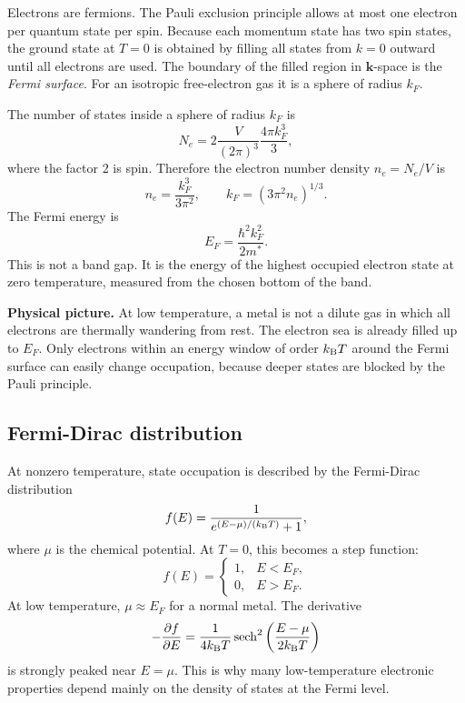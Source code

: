 \documentclass[11pt]{article}
\newcommand{\bk}{{\bm{k}}}
\begin{document}
Electrons are fermions. The Pauli exclusion principle allows at most one electron per quantum state per spin. Because each momentum state has two spin states, the ground state at $T=0$ is obtained by filling all states from $k=0$ outward until all electrons are used. The boundary of the filled region in $\bk$-space is the \emph{Fermi surface}. For an isotropic free-electron gas it is a sphere of radius $k_F$.

The number of states inside a sphere of radius $k_F$ is
\begin{equation}
N_e=2\frac{V}{(2\pi)^3}\frac{4\pi k_F^3}{3},
\end{equation}
where the factor 2 is spin. Therefore the electron number density $n_e=N_e/V$ is
\begin{equation}
 n_e=\frac{k_F^3}{3\pi^2},\qquad
 k_F=(3\pi^2 n_e)^{1/3}.
\end{equation}
The Fermi energy is
\begin{equation}
 E_F=\frac{\hbar^2 k_F^2}{2m^*}.
\end{equation}
This is not a band gap. It is the energy of the highest occupied electron state at zero temperature, measured from the chosen bottom of the band.

\begin{physicsbox}
\textbf{Physical picture.} At low temperature, a metal is not a dilute gas in which all electrons are thermally wandering from rest. The electron sea is already filled up to $E_F$. Only electrons within an energy window of order $k_{\mathrm{B}} T$ around the Fermi surface can easily change occupation, because deeper states are blocked by the Pauli principle.
\end{physicsbox}

\subsection{Fermi-Dirac distribution}
At nonzero temperature, state occupation is described by the Fermi-Dirac distribution
\begin{equation}
 f(E)=\frac{1}{e^{(E-\mu)/(k_{\mathrm{B}} T)}+1},
\end{equation}
where $\mu$ is the chemical potential. At $T=0$, this becomes a step function:
\begin{equation}
 f(E)=\begin{cases}
1,& E<E_F,\\
0,& E>E_F.
\end{cases}
\end{equation}
At low temperature, $\mu\approx E_F$ for a normal metal. The derivative
\begin{equation}
 -\frac{\partial f}{\partial E}=\frac{1}{4\kB T}\sech^2\left(\frac{E-\mu}{2\kB T}\right)
\end{equation}
is strongly peaked near $E=\mu$. This is why many low-temperature electronic properties depend mainly on the density of states at the Fermi level.
\end{document}
